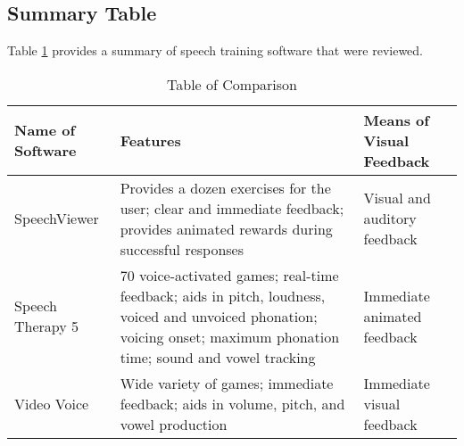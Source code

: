 \subsection{Summary Table}
Table \ref{tab:comparisontable2} provides a summary of speech training software that were reviewed.
\begin{table}[h!]   %
\centering
\caption{Table of Comparison} \vspace{0.25em}
\begin{tabular}{|p{1.5in}|p{2in}|p{2in}|}
 \hline
\centering
Name of Software & Features & Means of Visual Feedback \\ \hline
	SpeechViewer
		& Provides a dozen exercises for the user; clear and immediate feedback; provides animated rewards during successful responses 
		& Visual and auditory feedback
		\\ \hline
	Speech Therapy 5
		& 70 voice-activated games; real-time feedback; aids in pitch, loudness, voiced and unvoiced phonation; voicing onset; maximum phonation time; sound and vowel tracking
		& Immediate animated feedback
		\\ \hline
	Video Voice
		& Wide variety of games; immediate feedback; aids in volume, pitch, and vowel production
		& Immediate visual feedback
		\\ \hline
\end{tabular}
\label{tab:comparisontable2}
\end{table}